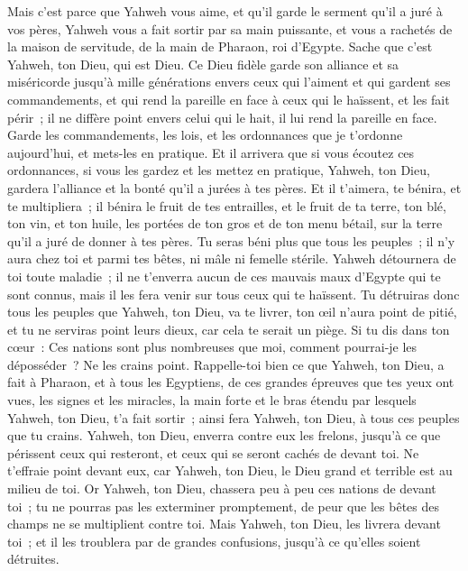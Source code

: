 \begin{multicols}{2}
Mais c'est parce que Yahweh vous aime, et qu'il garde le serment qu'il a juré à vos pères, Yahweh vous a fait sortir par sa main puissante, et vous a rachetés de la maison de servitude, de la main de Pharaon, roi d'Egypte.
Sache que c'est Yahweh, ton Dieu, qui est Dieu. Ce Dieu fidèle garde son alliance et sa miséricorde jusqu'à mille générations envers ceux qui l'aiment et qui gardent ses commandements,
et qui rend la pareille en face à ceux qui le haïssent, et les fait périr~; il ne diffère point envers celui qui le hait, il lui rend la pareille en face.
Garde les commandements, les lois, et les ordonnances que je t'ordonne aujourd'hui, et mets-les en pratique.
Et il arrivera que si vous écoutez ces ordonnances, si vous les gardez et les mettez en pratique, Yahweh, ton Dieu, gardera l'alliance et la bonté qu'il a jurées à tes pères.
Et il t'aimera, te bénira, et te multipliera~; il bénira le fruit de tes entrailles, et le fruit de ta terre, ton blé, ton vin, et ton huile, les portées de ton gros et de ton menu bétail, sur la terre qu'il a juré de donner à tes pères.
Tu seras béni plus que tous les peuples~; il n'y aura chez toi et parmi tes bêtes, ni mâle ni femelle stérile.
Yahweh détournera de toi toute maladie~; il ne t'enverra aucun de ces mauvais maux d'Egypte qui te sont connus, mais il les fera venir sur tous ceux qui te haïssent.
Tu détruiras donc tous les peuples que Yahweh, ton Dieu, va te livrer, ton œil n'aura point de pitié, et tu ne serviras point leurs dieux, car cela te serait un piège.
Si tu dis dans ton cœur~: Ces nations sont plus nombreuses que moi, comment pourrai-je les déposséder~?
Ne les crains point. Rappelle-toi bien ce que Yahweh, ton Dieu, a fait à Pharaon, et à tous les Egyptiens,
de ces grandes épreuves que tes yeux ont vues, les signes et les miracles, la main forte et le bras étendu par lesquels Yahweh, ton Dieu, t'a fait sortir~; ainsi fera Yahweh, ton Dieu, à tous ces peuples que tu crains.
Yahweh, ton Dieu, enverra contre eux les frelons, jusqu'à ce que périssent ceux qui resteront, et ceux qui se seront cachés de devant toi.
Ne t'effraie point devant eux, car Yahweh, ton Dieu, le Dieu grand et terrible est au milieu de toi.
Or Yahweh, ton Dieu, chassera peu à peu ces nations de devant toi~; tu ne pourras pas les exterminer promptement, de peur que les bêtes des champs ne se multiplient contre toi.
Mais Yahweh, ton Dieu, les livrera devant toi~; et il les troublera par de grandes confusions, jusqu'à ce qu'elles soient détruites.

\end{multicols}
